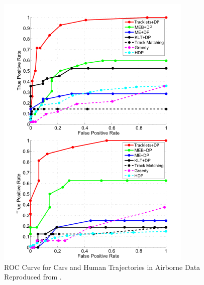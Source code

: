 \begin{figure}[hbt!]\centering
\includegraphics[width=.6\textwidth]{image/lit/roc.PNG}
\caption[ROC Curve for Cars and Human Trajectories in Airborne Data.]
{ROC Curve for Cars and Human Trajectories in Airborne Data
Reproduced from .}
\label{fig:rocresult}
\end{figure}
